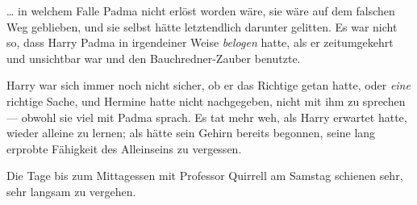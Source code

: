 … in welchem Falle Padma nicht erlöst worden wäre, sie wäre auf dem falschen Weg geblieben, und sie selbst hätte letztendlich darunter gelitten. Es war nicht so, dass Harry Padma in irgendeiner Weise \emph{belogen} hatte, als er zeitumgekehrt und unsichtbar war und den Bauchredner-Zauber benutzte.

Harry war sich immer noch nicht sicher, ob er das Richtige getan hatte, oder \emph{eine} richtige Sache, und Hermine hatte nicht nachgegeben, nicht mit ihm zu sprechen — obwohl sie viel mit Padma sprach. Es tat mehr weh, als Harry erwartet hatte, wieder alleine zu lernen; als hätte sein Gehirn bereits begonnen, seine lang erprobte Fähigkeit des Alleinseins zu vergessen.

Die Tage bis zum Mittagessen mit Professor Quirrell am Samstag schienen sehr, sehr langsam zu vergehen.

